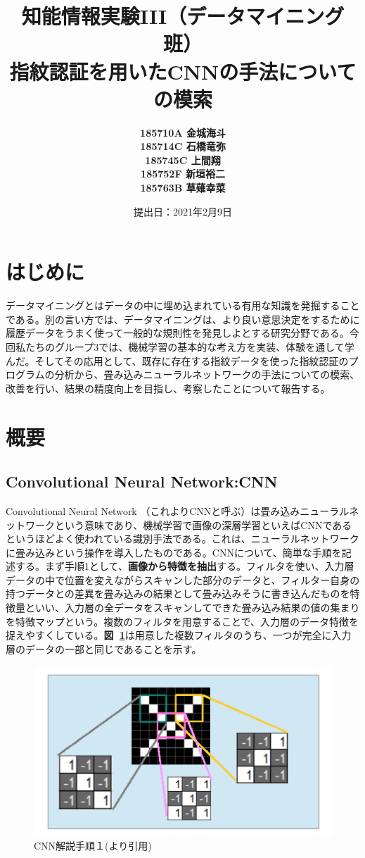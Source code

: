 \documentclass[a4paper, 11pt, titlepage]{jsarticle}
\title{知能情報実験III（データマイニング班）\\指紋認証を用いたCNNの手法についての模索}
\author{\textbf{185710A 金城海斗}\\
\textbf{185714C 石橋竜弥}\\
 \textbf{185745C 上間翔}\\
 \textbf{185752F 新垣裕二}\\
 \textbf{185763B 草薙幸菜}}
\date{提出日：2021年2月9日}
\begin{document}
\maketitle
\tableofcontents
\clearpage


\section{はじめに}
データマイニングとはデータの中に埋め込まれている有用な知識を発掘することである。別の言い方では、データマイニングは、より良い意思決定をするために履歴データをうまく使って一般的な規則性を発見しよとする研究分野である。今回私たちのグループ3では、機械学習の基本的な考え方を実装、体験を通して学んだ。そしてその応用として、既存に存在する指紋データを使った指紋認証のプログラムの分析から、畳み込みニューラルネットワークの手法についての模索、改善を行い、結果の精度向上を目指し、考察したことについて報告する。
\section{概要}

\subsection{Convolutional Neural Network:CNN}
Convolutional Neural Network （これよりCNNと呼ぶ）は畳み込みニューラルネットワークという意味であり、機械学習で画像の深層学習といえばCNNであるというほどよく使われている識別手法である。これは、ニューラルネットワークに畳み込みという操作を導入したものである。CNNについて、簡単な手順を記述する。まず手順1として、\textbf{画像から特徴を抽出}する。フィルタを使い、入力層データの中で位置を変えながらスキャンした部分のデータと、フィルター自身の持つデータとの差異を畳み込みの結果として畳み込みそうに書き込んだものを特徴量といい、入力層の全データをスキャンしてできた畳み込み結果の値の集まりを特徴マップという。複数のフィルタを用意することで、入力層のデータ特徴を捉えやすくしている。\textbf{図~\ref{cnn1}}は用意した複数フィルタのうち、一つが完全に入力層のデータの一部と同じであることを示す。

\begin{figure}[h]
  \centering
  \includegraphics[scale=0.4]{cnn1.png}
  \caption{CNN解説手順１(\cite{cnn}より引用)}
  \label{cnn1}
\end{figure}
\end{document}
